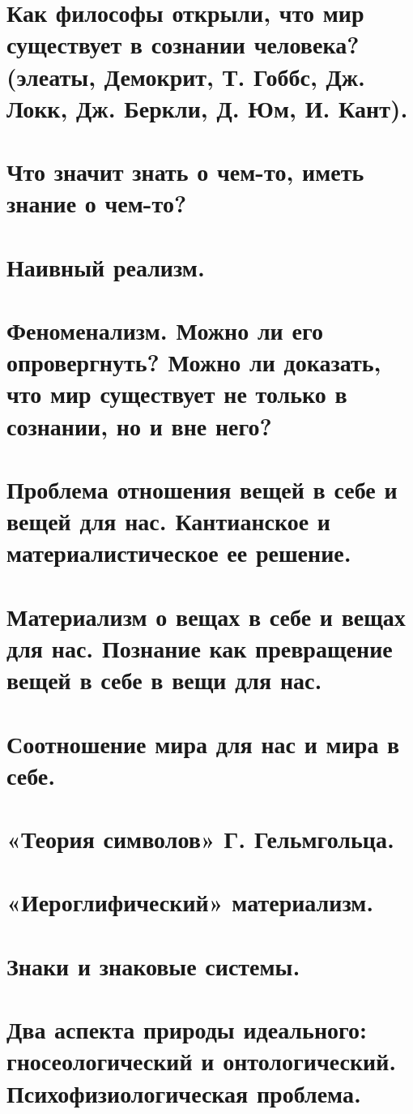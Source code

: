 \section{ Как философы открыли, что мир существует в сознании человека? (элеаты, Демокрит, Т. Гоббс, Дж. Локк, Дж. Беркли, Д. Юм, И. Кант).}
\section{ Что значит знать о чем-то, иметь знание о чем-то?}
\section{ Наивный реализм.}
\section{ Феноменализм. Можно ли его опровергнуть? Можно ли доказать, что мир существует не только в сознании, но и вне него?}
\section{ Проблема отношения вещей в себе и вещей для нас. Кантианское и материалистическое ее решение.}
\section{ Материализм о вещах в себе и вещах для нас. Познание как превращение вещей в себе в вещи для нас.}
\section{ Соотношение мира для нас и мира в себе.}
\section{ «Теория символов» Г. Гельмгольца.}
\section{ «Иероглифический» материализм.}
\section{ Знаки и знаковые системы.}
\section{ Два аспекта природы идеального: гносеологический и онтологический. Психофизиологическая проблема.}
